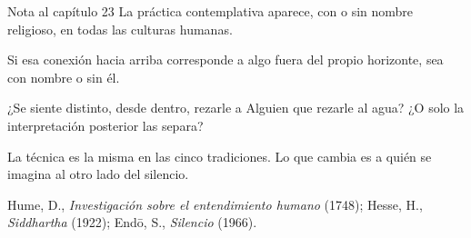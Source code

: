 \begin{notacap}{Nota al capítulo 23}
 La práctica contemplativa aparece, con o sin nombre religioso, en todas las culturas humanas.

 Si esa conexión hacia arriba corresponde a algo fuera del propio horizonte, sea con nombre o sin él.

 ¿Se siente distinto, desde dentro, rezarle a Alguien que rezarle al agua? ¿O solo la interpretación posterior las separa?

 La técnica es la misma en las cinco tradiciones. Lo que cambia es a quién se imagina al otro lado del silencio.

 Hume, D., \emph{Investigación sobre el entendimiento humano} (1748); Hesse, H., \emph{Siddhartha} (1922); Endō, S., \emph{Silencio} (1966).
\end{notacap}
